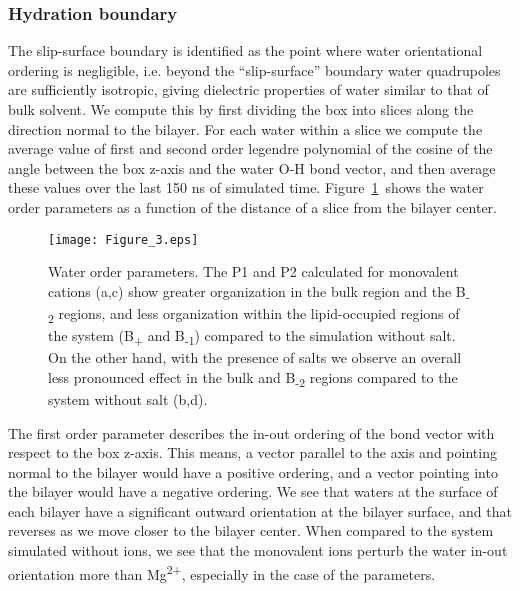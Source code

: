 \subsubsection{Hydration boundary}
The slip-surface boundary is identified as the point where 
water orientational ordering is negligible, i.e.
beyond the ``slip-surface'' 
boundary water {quadrupoles} are {sufficiently isotropic,
giving dielectric properties of water similar to that of bulk solvent}.
We compute this by first dividing the box into 
slices along the direction normal to the bilayer. 
For each water within a slice we 
compute the average value of first and second order legendre polynomial of 
the cosine of the angle between the box z-axis and
the water O-H bond vector, and then average these values over the last 150 ns of simulated time.
Figure~\ref{figch3:h2order}~shows the water order parameters 
as a function of the distance of a slice from the bilayer center.
\begin{figure}[H]
    \caption[Water orientational order parameters]{Water order parameters.   
        {The P1 and P2 calculated for monovalent cations (a,c) show greater 
            organization in the bulk region and the B\textsubscript{-2} regions, and less organization within 
            the lipid-occupied regions of the system (B\textsubscript{+} and B\textsubscript{-1}) compared to the simulation without salt. 
        } 
{On the other hand, with the presence of \mg salts we observe an overall less pronounced effect in the
bulk and B\textsubscript{-2} regions compared to the system without salt (b,d).}
}
    
    \label{figch3:h2order}
    \texttt{[image: Figure\_3.eps]}
\end{figure}

The first order parameter describes the in-out ordering of the bond vector with respect to the 
box z-axis. This means, a vector parallel to the axis and pointing normal to the bilayer would have a positive
ordering, and a vector pointing into the bilayer would have a negative ordering. We see that waters at the surface
of each bilayer have a significant outward orientation at the bilayer surface, and that reverses as we move
closer to the bilayer center. When compared to the system simulated without ions, we see that
the monovalent ions perturb the water in-out orientation 
more than Mg\textsuperscript{2+}, especially in the case of the \mgmicro{}
parameters.

